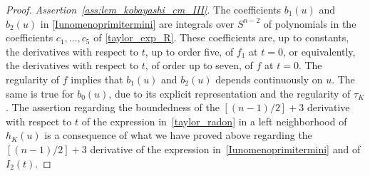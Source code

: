 \documentclass[a4paper]{amsart}
\theoremstyle{definition}
\numberwithin{equation}{section}
\begin{document}
\begin{proof}
\emph{Assertion~\eqref{ass:lem_kobayashi_cm_III}.}
The coefficients $b_1(u)$ and $b_2(u)$ in \eqref{Iunomenoprimitermini} are integrals over ${S^{n-2}}$ of polynomials in the coefficients $c_1,\dots, c_5$ of \eqref{taylor_exp_R}.
These coefficients are, up to constants, the derivatives with respect to $t$, up to order five, of $f_1$ at $t=0$, or equivalently,  the derivatives with respect to $t$, of order up to seven, of $f$ at $t=0$.
The regularity of $f$ implies that  $b_1(u)$ and $b_2(u)$ depends continuously on $u$. The same is true for $b_0(u)$, due to its explicit representation and the regularity of ${\tau}_K$.
The assertion regarding the boundedness of the $[(n-1)/2]+3$  derivative with respect to $t$ of the expression in~\eqref{taylor_radon} in a left neighborhood of $h_K(u)$ is a consequence of what we have proved above regarding the
$[(n-1)/2]+3$ derivative of the expression in~\eqref{Iunomenoprimitermini} and of $I_2(t)$.
\end{proof}
\end{document}
